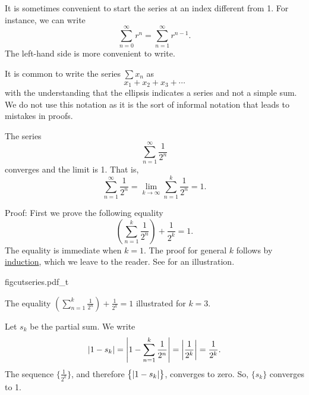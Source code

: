 \begin{remark}
It is sometimes convenient to start
the series at an index different from 1.  For instance, we can write
\begin{equation*}
\sum_{n=0}^\infty r^n = \sum_{n=1}^\infty r^{n-1} .
\end{equation*}
The left-hand side is more convenient to write.
\end{remark}

\begin{remark}
It is common to write the series $\sum x_n$ as
\begin{equation*}
x_1 + x_2 + x_3 + \cdots
\end{equation*}
with the understanding that the ellipsis indicates a series and
not a simple sum.  We do not use this notation as it is the sort of informal
notation that leads to mistakes in proofs.
\end{remark}

\begin{example}
The series
\begin{equation*}
\sum_{n=1}^\infty \frac{1}{2^n}
\end{equation*}
converges and the limit is 1.  That is,
\begin{equation*}
\sum_{n=1}^\infty \frac{1}{2^n} = 
\lim_{k\to\infty} \sum_{n=1}^k \frac{1}{2^n} = 
1 .
\end{equation*}

Proof: First we prove the following equality
\begin{equation*}
\left( \sum_{n=1}^k \frac{1}{2^n} \right)
+ \frac{1}{2^k}
= 1 .
\end{equation*}
The equality is immediate when $k=1$.  The proof for general $k$
follows by \hyperref[induction:thm]{induction}, which we leave to the
reader.  See  for an illustration.
\begin{myfigureht}
{figcutseries.pdf_t}
\caption{The equality 
$\left( \sum_{n=1}^k \frac{1}{2^n} \right)
+ \frac{1}{2^k}
= 1$ illustrated for $k=3$.\label{figcutseries}}
\end{myfigureht}

Let $s_k$ be the partial sum.  We write
\begin{equation*}
\left\lvert {
1 - s_k 
} \right\rvert
=
\left\lvert {
1 - 
\sum_{n=1}^k \frac{1}{2^n}
} \right\rvert
=
\left\lvert {\frac{1}{2^k}} \right\rvert = 
\frac{1}{2^k} .
\end{equation*}
The sequence $\bigl\{ \frac{1}{2^k} \bigr\}$, and
therefore $\bigl\{ \left\lvert {1-s_k} \right\rvert \bigr\}$,
converges to zero.  So, $\{ s_k \}$ converges to 1.
\end{example}

